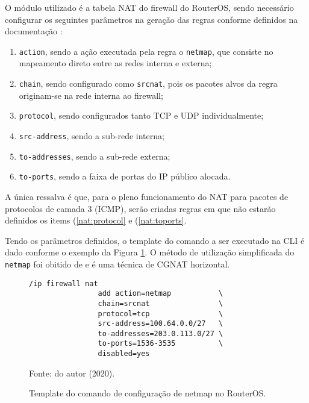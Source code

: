     O módulo utilizado é a tabela NAT do firewall do RouterOS, sendo necessário configurar os seguintes parâmetros na geração das regras conforme definidos na documentação \cite{natmikrotik}:

    \begin{enumerate}[label=\alph*)]
        \item \label{nat:action} {\tt action}, sendo a ação executada pela regra o {\tt netmap}, que consiste no mapeamento direto entre as redes interna e externa;
        
        \item \label{nat:chain} {\tt chain}, sendo configurado como {\tt srcnat}, pois os pacotes alvos da regra originam-se na rede interna ao firewall; 
        
        \item \label{nat:protocol} {\tt protocol}, sendo configurados tanto TCP e UDP individualmente; 
        
        \item \label{nat:srcaddress} {\tt src-address}, sendo a sub-rede interna;
        
        \item \label{nat:toaddress} {\tt to-addresses}, sendo a sub-rede externa;
        
        \item \label{nat:toports} {\tt to-ports}, sendo a faixa de portas do IP público alocada.
    \end{enumerate}

    A única ressalva é que, para o pleno funcionamento do NAT para pacotes de protocolos de camada 3 (ICMP), serão criadas regras em que não estarão definidos os items (\ref{nat:protocol} e (\ref{nat:toports}.

    Tendo os parâmetros definidos, o template do comando a ser executado na CLI é dado conforme o exemplo da Figura \ref{fig:netmap_cli}. O método de utilização simplificada do {\tt netmap} foi obitido de \cite{maia2018} e é uma técnica de CGNAT horizontal.

    \begin{figure}[!htb]
        \centering
        \caption{Template do comando de configuração de netmap no RouterOS.} 
        \label{fig:netmap_cli}
        
        \begin{Verbatim}[fontsize=\small]
            /ip firewall nat 
                add action=netmap           \
                chain=srcnat                \
                protocol=tcp                \
                src-address=100.64.0.0/27   \
                to-addresses=203.0.113.0/27 \
                to-ports=1536-3535          \
                disabled=yes
        \end{Verbatim} 

        {\small Fonte: do autor (2020).} 
    \end{figure}

